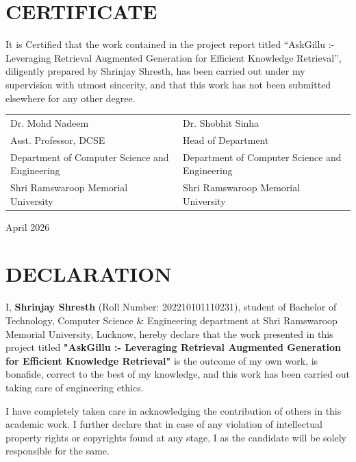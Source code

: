 \documentclass[12pt,a4paper]{report}
\begin{document}


\chapter*{CERTIFICATE}
It is Certified that the work contained in the project report titled ``AskGillu :- Leveraging Retrieval Augmented Generation for Efficient Knowledge Retrieval'', diligently prepared by Shrinjay Shresth, has been carried out under my supervision with utmost sincerity, and that this work has not been submitted elsewhere for any other degree.

\vspace{2cm}
\noindent
\begin{tabularx}{\textwidth}{@{}X X@{}}
Dr. Mohd Nadeem & Dr. Shobhit Sinha \\
Asst. Professor, DCSE & Head of Department \\
Department of Computer Science and Engineering & Department of Computer Science and Engineering \\
Shri Ramswaroop Memorial University & Shri Ramswaroop Memorial University \\
\end{tabularx}

\vspace{1cm}
April 2026
\clearpage

\chapter*{DECLARATION}

I, \textbf{Shrinjay Shresth} (Roll Number: 202210101110231), student of Bachelor of Technology, Computer Science \& Engineering department at Shri Ramswaroop Memorial University, Lucknow, hereby declare that the work presented in this project titled \textbf{"AskGillu :- Leveraging Retrieval Augmented Generation for Efficient Knowledge Retrieval"} is the outcome of my own work, is bonafide, correct to the best of my knowledge, and this work has been carried out taking care of engineering ethics.

I have completely taken care in acknowledging the contribution of others in this academic work. I further declare that in case of any violation of intellectual property rights or copyrights found at any stage, I as the candidate will be solely responsible for the same.
\end{document}
